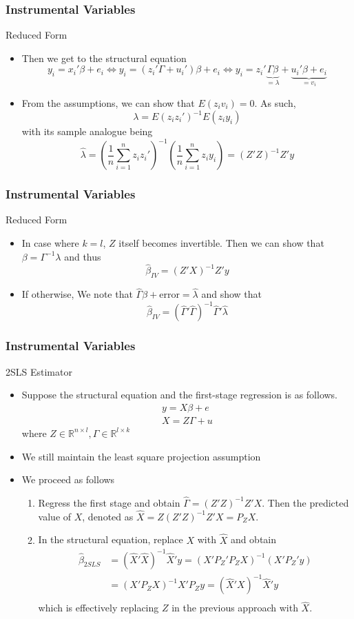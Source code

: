 \documentclass{beamer}
\begin{document}
\begin{frame}
\frametitle{Instrumental Variables}
Reduced Form
\begin{itemize}
\item Then we get to the structural equation 
\[
y_i=x_i'\beta+e_i \iff y_i =(z_i'\Gamma+u_i')\beta+e_i \iff y_i = z_i'\underbrace{\Gamma\beta}_{=\lambda}+\underbrace{u_i'\beta+e_i}_{=v_i}
\]
\item From the assumptions, we can show that $E(z_iv_i)=0$. As such, 
\[
\lambda=E(z_iz_i')^{-1}E(z_iy_i)
\]
with its sample analogue being 
\[
\hat{\lambda}=\left(\frac{1}{n}\sum_{i=1}^n z_iz_i'\right)^{-1} \left(\frac{1}{n}\sum_{i=1}^n z_iy_i\right)=(Z'Z)^{-1}Z'y
\]
\end{itemize}
\end{frame}

\begin{frame}
\frametitle{Instrumental Variables}
Reduced Form
\begin{itemize}
\item In case where $k=l$, $Z$ itself becomes invertible. Then we can show that $\beta=\Gamma^{-1}\lambda$ and thus 
\[
\hat{\beta}_{IV}=(Z'X)^{-1}Z'y
\]
\item If otherwise, We note that $\widehat{\Gamma}\beta+\text{error}=\hat{\lambda}$ and show that 
\[
\hat{\beta}_{IV}=(\widehat{\Gamma}'\widehat{\Gamma})^{-1}\widehat{\Gamma}'\hat{\lambda}
\]
\end{itemize}
\end{frame}

\begin{frame}
\frametitle{Instrumental Variables}
2SLS Estimator
\begin{itemize}
\item  Suppose the structural equation and the first-stage regression is as follows.
\begin{gather*}
y=X\beta+e \tag{Structural}\\
X=Z\Gamma+u \tag{First Stage}
\end{gather*}
where $Z\in\mathbb{R}^{n\times l},\Gamma\in\mathbb{R}^{l\times k}$
\item We still maintain the least square projection assumption
\item We proceed as follows
\begin{enumerate}
\item Regress the first stage and obtain $\widehat{\Gamma}=(Z'Z)^{-1}Z'X$. Then the predicted value of $X$, denoted as $\widehat{X}=Z(Z'Z)^{-1}Z'X=P_ZX$.
\item In the structural equation, replace $X$ with $\widehat{X}$ and obtain
\[
\begin{aligned}
\hat{\beta}_{2SLS}&=(\widehat{X}'\widehat{X})^{-1}\widehat{X}'y=(X'P_Z'P_ZX)^{-1}(X'P_Z'y)\\
&=(X'P_ZX)^{-1}X'P_Zy =(\widehat{X}'X)^{-1}\widehat{X}'y\\
\end{aligned}
\]
which is effectively replacing $Z$ in the previous approach with $\widehat{X}$. 
\end{enumerate}
\end{itemize}
\end{frame}
\end{document}
